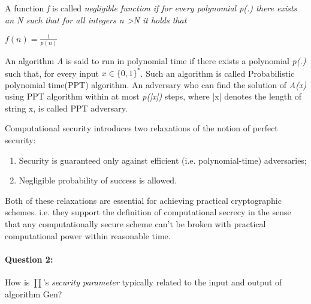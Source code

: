 \documentclass{article}
\begin{document}
        \begin{flushleft}
            A function \emph{f} is called \emph{negligible function} \emph{if for every polynomial p(.) there exists an N such that for all integers n \textgreater N it holds that}
            \begin{center}
                $
                    f(n) = \frac{1}{p(n)}
                $
            \end{center}
            
            An algorithm \emph{A} is said to run in polynomial time if there exists a polynomial \emph{p(.)} such that, for every input 
                $
                    x\in\{0,1\}^*
                $.
            Such an algorithm is called Probabilistic polynomial time(PPT) algorithm.
            An adversary who can find the solution of \emph{A(x)} using PPT algorithm within at most \emph{p(|x|)} steps, where |x| denotes the length of string x, is called PPT adversary. \newline
            
            Computational security introduces two relaxations of the notion of perfect security:
            \begin{enumerate}
                \item Security is guaranteed only against  efficient (i.e. polynomial-time) adversaries;
                \item Negligible probability of success is allowed.
            \end{enumerate}
            Both of these relaxations are essential for achieving practical cryptographic schemes. i.e. they support the definition of computational secrecy in the sense that any computationally secure scheme can't be broken with practical computational power within reasonable time.
        \end{flushleft}
    
    \paragraph{Question 2:} How is $\prod$'s \emph{security parameter} typically related to the input and output of algorithm Gen?
    
\end{document}
